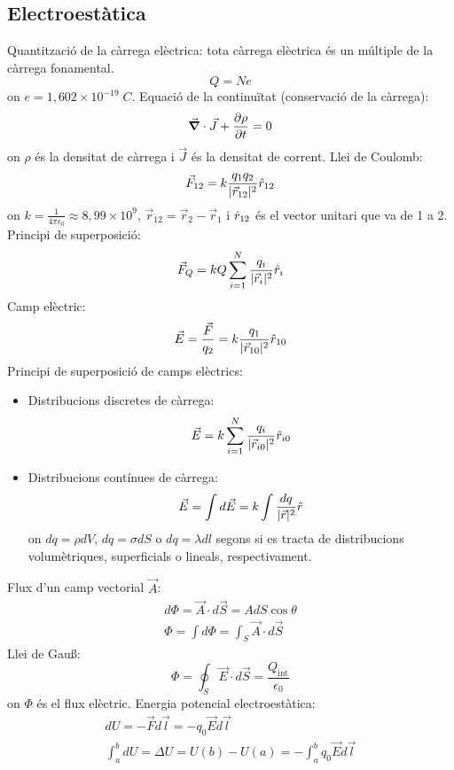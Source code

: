 \documentclass[../../../main.tex]{subfiles}
\begin{document}
\begin{multicols}{2}
    \subsection{Electroestàtica}
    Quantització de la càrrega elèctrica: tota càrrega elèctrica és un múltiple de la càrrega fonamental.
    $$Q=Ne$$
    {on $e=1,602\times10^{-19}\;C$.}\newline
    Equació de la continuïtat (conservació de la càrrega): $$\Vec{\grad}\cdot\Vec{J}+\frac{\partial\rho}{\partial t}=0$$
    {on $\rho$ és la densitat de càrrega i $\Vec{J}$ és la densitat de corrent.}\newline
    Llei de Coulomb: $$\Vec{F}_{12}=k\frac{q_1q_2}{|\Vec{r}_{12}|^2}\Hat{r}_{12}$$
    {on $k=\frac{1}{4\pi\epsilon_0}\approx8,99\times10^9$, $\Vec{r}_{12}=\Vec{r}_2-\Vec{r}_1$ i $\Hat{r}_{12}$ és el vector unitari que va de 1 a 2.}\newline
    Principi de superposició: $$\Vec{F}_Q=kQ\sum_{i=1}^N\frac{q_i}{|\Vec{r}_i|^2}\Hat{r}_i$$
    Camp elèctric: $$\Vec{E}=\frac{\Vec{F}}{q_2}=k\frac{q_1}{|\Vec{r}_{10}|^2}\Hat{r}_{10}$$
    Principi de superposició de camps elèctrics:
    \begin{itemize}
        \item Distribucions discretes de càrrega:
              $$\Vec{E}=k\sum_{i=1}^N\frac{q_i}{|\Vec{r}_{i0}|^2}\Hat{r}_{i0}$$
        \item Distribucions contínues de càrrega:
              $$\Vec{E}=\int d\Vec{E}=k\int\frac{dq}{|\Vec{r}|^2}\Hat{r}$$
              {on $dq=\rho dV$, $dq=\sigma dS$ o $dq=\lambda dl$ segons si es tracta de distribucions volumètriques, superficials o lineals, respectivament.}
    \end{itemize}
    Flux d'un camp vectorial $\Vec{A}$:
    \begin{gather*}
        d\Phi=\Vec{A}\cdot d\Vec{S}=AdS\cos\theta\\
        \Phi=\int d\Phi=\int_S\Vec{A}\cdot d\Vec{S}
    \end{gather*}
    Llei de Gau\ss:
    $$\Phi=\oint_S\Vec{E}\cdot d\Vec{S}=\frac{Q_{\text{int}}}{\epsilon_0}$${on $\Phi$ és el flux elèctric.}\newline
    Energia potencial electroestàtica:
    \begin{gather*}
        dU=-\Vec{F}d\Vec{l}=-q_0\Vec{E}d\Vec{l}\\
        \int_a^bdU=\Delta U=U(b)-U(a)=-\int_a^bq_0\Vec{E}d\Vec{l}
    \end{gather*}

\end{multicols}
\end{document}
